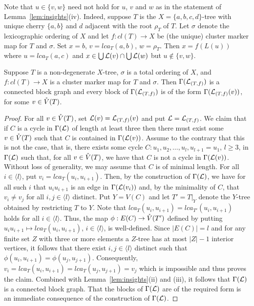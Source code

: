 Note that $u\in \{v,w\}$ need not hold for $u$, $v$ and $w$ as in the
statement of Lemma~\ref{lem:insights}(iv).  Indeed, suppose $T$ is the
$X=\{a,b,c,d\}$-tree with unique cherry $\{a,b\}$ and $d$ adjacent with the
root $\rho_T$ of $T$. Let $\sigma$ denote the lexicographic ordering of $X$
and let $f:cl(T)\to X$ be (the unique) cluster marker map for $T$ and
$\sigma$.  Set $x=b$, $v=lca_T(a,b)$, $w=\rho_T$.  Then $x=f(L(u))$ where
$u=lca_T(a,c)$ and $x\in \bigcup{\mathcal L}(v)\cap \bigcup{\mathcal L}(w)$ but $u\not\in
\{v,w\}$.

\begin{pro}
  \label{prop:block}
  Suppose $T$ is a non-degenerate $X$-tree, $\sigma$ is a total ordering of
  $X$, and $f:cl(T)\to X$ is a cluster marker map for $T$ and $\sigma$. Then
  $\Gamma({\mathcal L}_{(T,f)})$ is a connected block graph and every block of
  $\Gamma({\mathcal L}_{(T,f)})$ is of the form $\Gamma({\mathcal L}_{(T,f)}(v))$, for some
  $v\in \mathring{V}(T)$.
\end{pro}
\begin{proof}
  For all $v\in \mathring{V}(T)$, set ${\mathcal L}(v)={\mathcal L}_{(T,f)}(v)$ and put
  ${\mathcal L}={\mathcal L}_{(T,f)}$.  We claim that if $C$ is a cycle in $\Gamma({\mathcal L})$ of
  length at least three then there must exist some $v\in \mathring{V}(T)$ such that $C$
  is contained in $\Gamma({\mathcal L}(v))$. Assume to the contrary that this is not
  the case, that is, there exists some cycle $C:u_1,u_2,\ldots,
  u_l,u_{l+1}=u_1$, $l\geq 3$, in $\Gamma({\mathcal L})$ such that, for all $v\in
  \mathring{V}(T)$, we have that $C$ is not a cycle in $\Gamma({\mathcal L}(v))$. Without loss
  of generality, we may assume that $C$ is of minimal length. For all
  $i\in\langle l\rangle$, put $v_i=lca_T(u_i,u_{i+1})$. Then, by the
  construction of $\Gamma({\mathcal L})$, we have for all such $i$ that $u_iu_{i+1}$ is
  an edge in $\Gamma({\mathcal L}(v_i))$ and, by the minimality of $C$, that
  $v_i\not=v_j$ for all $i,j\in\langle l\rangle$ distinct. Put $Y=V(C)$ and
  let $T'=T|_Y$ denote the $Y$-tree obtained by restricting $T$ to $Y$. Note
  that $lca_T(u_i,u_{i+1})=lca_{T'}(u_i,u_{i+1})$ holds for all $i\in\langle
  l\rangle$.  Thus, the map $\phi:E(C)\to \mathring{V}(T')$ defined by putting
  $u_iu_{i+1}\mapsto lca_{T}(u_i,u_{i+1})$, $i\in\langle l \rangle$, is
  well-defined.  Since $|E(C)|=l$ and for any finite set $Z$ with three or
  more elements a $Z$-tree has at most $|Z|-1$ interior vertices, it follows
  that there exist $i,j\in \langle l \rangle$ distinct such that
  $\phi(u_i,u_{i+1})=\phi(u_j,u_{j+1})$. Consequently,
  $v_i=lca_T(u_i,u_{i+1})=lca_T(u_j,u_{j+1})=v_j$ which is impossible and thus
  proves the claim.  Combined with Lemma~\ref{lem:insights}(ii) and (iii), it
  follows that $\Gamma({\mathcal L})$ is a connected block graph. That the blocks of
  $\Gamma({\mathcal L})$ are of the required form is an immediate consequence of the
  construction of $\Gamma({\mathcal L})$.
\end{proof}



